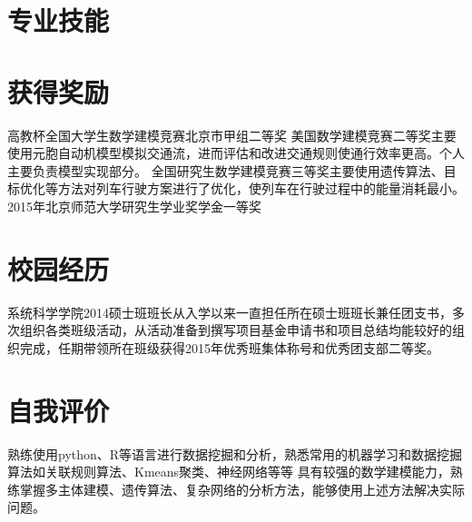 \documentclass[11pt,a4paper]{moderncv}
\begin{document}
\section{专业技能}

\section{获得奖励} %
{高教杯全国大学生数学建模竞赛北京市甲组二等奖}{}{}{}{}
{美国数学建模竞赛二等奖}{}{}{}{主要使用元胞自动机模型模拟交通流，进而评估和改进交通规则使通行效率更高。个人主要负责模型实现部分。}
{全国研究生数学建模竞赛三等奖}{}{}{}{主要使用遗传算法、目标优化等方法对列车行驶方案进行了优化，使列车在行驶过程中的能量消耗最小。}
{2015年北京师范大学研究生学业奖学金一等奖}{}{}{}{}

\section{校园经历} %
{系统科学学院2014硕士班班长}{}{}{}{从入学以来一直担任所在硕士班班长兼任团支书，多次组织各类班级活动，从活动准备到撰写项目基金申请书和项目总结均能较好的组织完成，任期带领所在班级获得2015年优秀班集体称号和优秀团支部二等奖。}


\section{自我评价} %
\cventry{}
{熟练使用python、R等语言进行数据挖掘和分析，熟悉常用的机器学习和数据挖掘算法如关联规则算法、Kmeans聚类、神经网络等等}{}{}{}{}
\cventry{}
{具有较强的数学建模能力，熟练掌握多主体建模、遗传算法、复杂网络的分析方法，能够使用上述方法解决实际问题。}{}{}{}{}
\closesection{}                   %
\renewcommand{\listitemsymbol}{-} %
\end{document}
